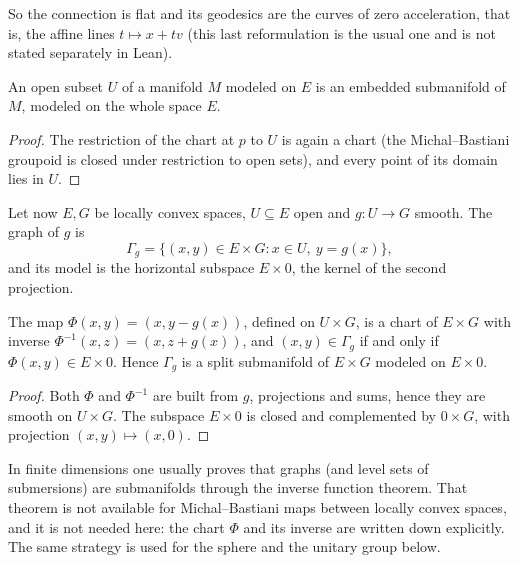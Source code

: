 So the connection is flat and its geodesics are the curves of zero acceleration, that is, the
affine lines $t \mapsto x + t v$ (this last reformulation is the usual one and is not stated
separately in Lean).

\begin{proposition}
  \label{prop:ex-open}
  \leanok
  An open subset $U$ of a manifold $M$ modeled on $E$ is an embedded submanifold of $M$, modeled
  on the whole space $E$.
\end{proposition}

\begin{proof}
  \leanok
  The restriction of the chart at $p$ to $U$ is again a chart (the Michal--Bastiani groupoid is
  closed under restriction to open sets), and every point of its domain lies in $U$.
\end{proof}

Let now $E, G$ be locally convex spaces, $U \subseteq E$ open and $g \colon U \to G$ smooth.
The graph of $g$ is
\[
  \Gamma_g = \{(x, y) \in E \times G : x \in U,\ y = g(x)\},
\]
and its model is the horizontal subspace $E \times 0$, the kernel of the second projection.

\begin{proposition}[Graphs]
  \label{prop:ex-graph}
  \leanok
  The map $\Phi(x, y) = (x, y - g(x))$, defined on $U \times G$, is a chart of $E \times G$ with
  inverse $\Phi^{-1}(x, z) = (x, z + g(x))$, and $(x, y) \in \Gamma_g$ if and only if
  $\Phi(x, y) \in E \times 0$. Hence $\Gamma_g$ is a split submanifold of $E \times G$ modeled on
  $E \times 0$.
\end{proposition}

\begin{proof}
  \leanok
  Both $\Phi$ and $\Phi^{-1}$ are built from $g$, projections and sums, hence they are smooth on
  $U \times G$. The subspace $E \times 0$ is closed and complemented by $0 \times G$, with
  projection $(x, y) \mapsto (x, 0)$.
\end{proof}

\begin{remark}
  In finite dimensions one usually proves that graphs (and level sets of submersions) are
  submanifolds through the inverse function theorem. That theorem is not available for
  Michal--Bastiani maps between locally convex spaces, and it is not needed here: the chart
  $\Phi$ and its inverse are written down explicitly. The same strategy is used for the sphere
  and the unitary group below.
\end{remark}

